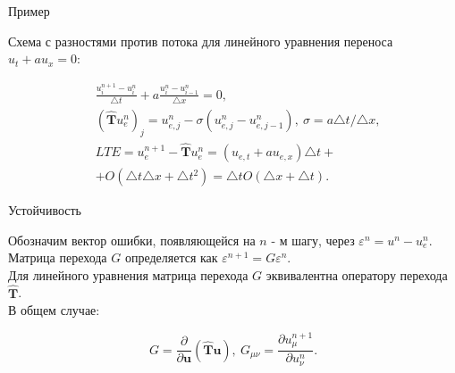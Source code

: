 \documentclass[10pt,xcolor=pst,aspectratio=169]{beamer}
\begin{document}
\begin{frame}{Пример}

	\transdissolve[duration=0.1]
	\justifying
	\large

	Схема с разностями против потока для линейного уравнения переноса $u_{t} + a u_{x} = 0$:

	\[
		\begin{split}
			&\frac{u^{n + 1}_{i} - u^{n}_{i}}{\triangle t} + a \frac{u^{n}_{i} - u^{n}_{i - 1}}{\triangle x} = 0, \\
			&\left( \hat{\textbf{T}} u^{n}_{e} \right)_{j} = u^{n}_{e, j} - \sigma \left( u^{n}_{e, j} - u^{n}_{e, j - 1} \right), \: \sigma = a \triangle t / \triangle x, \\
			&LTE = u^{n + 1}_{e} - \hat{\textbf{T}} u^{n}_{e} = \left( u_{e, t} + a u_{e, x} \right) \triangle t +\\
			& + O \left( \triangle t \triangle x + \triangle t^{2} \right) = \triangle t O \left( \triangle x + \triangle t \right).
		\end{split}
	\]

\end{frame}

\begin{frame}{Устойчивость}

	\transdissolve[duration=0.1]
	\justifying
	\large

	Обозначим вектор ошибки, появляющейся на $n$ - м шагу, через $\varepsilon^{n} = u^{n} - u^{n}_{e}$.\\

	Матрица перехода $G$ определяется как $\varepsilon^{n + 1} = G \varepsilon^{n}$.\\

	Для линейного уравнения матрица перехода $G$ эквивалентна оператору перехода $\hat{\textbf{T}}$.\\

	В общем случае:

	\[
		G = \frac{\partial}{\partial \textbf{u}} \left( \hat{\textbf{T}} \textbf{u} \right), \: G_{\mu \nu} = \frac{\partial u^{n + 1}_{\mu}}{\partial u^{n}_{\nu}}.
	\]

\end{frame}
\end{document}
